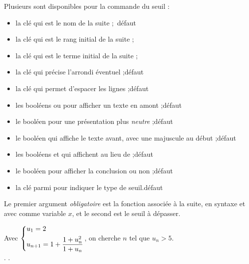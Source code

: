 \begin{cautionblock}
Plusieurs  sont disponibles pour la commande du seuil :

\begin{itemize}
	\item la clé  qui est le nom de la suite ;\hfill~défaut 
	\item la clé  qui est le rang initial de la suite ;
	\item la clé  qui est le terme initial de la suite ;
	\item la clé  qui précise l'arrondi éventuel ;\hfill{}défaut 
	\item la clé  qui permet d'espacer les lignes ;\hfill{}défaut 
	\item les booléens  ou  pour afficher un texte en amont ;\hfill{}défaut 
	\item le booléen  pour une présentation plus \textit{neutre} ;\hfill{}défaut 
	\item le booléen  qui affiche le texte avant, avec une majuscule au début ;\hfill{}défaut 
	\item les booléens  et  qui affichent \ctex{=} au lieu de  ;\hfill{}défaut 
	\item le booléen  pour afficher la conclusion ou non ;\hfill{}défaut 
	\item la clé  parmi \Cle{< / > / <= / >=} pour indiquer le type de seuil.\hfill{}défaut \Cle{>}
\end{itemize}

\smallskip

Le premier argument \textit{obligatoire} est la fonction associée à la suite, en syntaxe  et avec comme variable $x$, et le second est le seuil à dépasser.
\end{cautionblock}

\begin{PresCodePL}{}
Avec $\begin{dcases} u_1 = 2 \\ u_{n+1}=1+\dfrac{1+u_n^2}{1+u_n} \end{dcases}$,
on cherche $n$ tel que $u_n > 5$.\\
. .
\end{PresCodePL}

